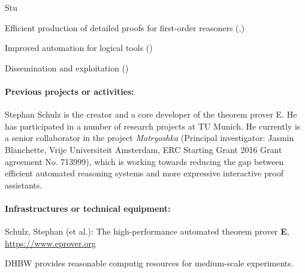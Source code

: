 \begin{sitedescription}{Stu}
\begin{compactitem}
\item Efficient production of detailed proofs for first-order
  reasoners (,)
\item Improved automation for logical tools ()
\item Dissemination and exploitation ()
\end{compactitem}


\paragraph*{Previous projects or activities:}

Stephan Schulz is the creator and a core developer of the theorem
prover E.  He has participated in a number of research projects at TU
Munich. He currently is a senior collaborator in the project
\emph{Matryoshka} (Principal investigator: Jasmin Blanchette, Vrije
Universiteit Amsterdam, ERC Starting Grant 2016 Grant agreement
No. 713999), which is working towards reducing the gap between
efficient automated reasoning systems and more expressive interactive
proof assistants.

\paragraph*{Infrastructures or technical equipment:}

\begin{compactitem}
\item Schulz, Stephan (et al.): The high-performance automated theorem
  prover \textbf{E}, \url{https://www.eprover.org}
\item DHBW provides reasonable computig resources for medium-scale
  experiments.
\end{compactitem}





\end{sitedescription}
